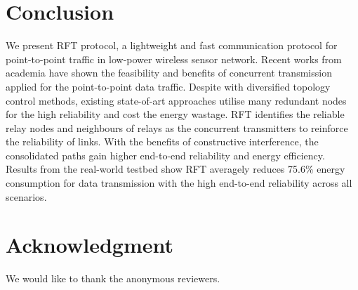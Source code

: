 \documentclass[conference]{IEEEtran}
\begin{document}
\section{Conclusion}
We present RFT protocol, a lightweight and fast communication protocol for point-to-point traffic in low-power wireless sensor network. Recent works from academia have shown the feasibility and benefits of concurrent transmission applied for the point-to-point data traffic.  Despite with diversified topology control methods, existing state-of-art approaches utilise many redundant nodes for the high reliability and cost the energy wastage. RFT identifies the reliable relay nodes and neighbours of relays as the concurrent transmitters to reinforce the reliability of links. With the benefits of constructive interference, the consolidated paths gain higher end-to-end reliability and energy efficiency. Results from the real-world testbed show RFT averagely reduces 75.6\% energy consumption for data transmission with the high end-to-end reliability across all scenarios. %






\section*{Acknowledgment}


We would like to thank the anonymous reviewers.





\end{document}
